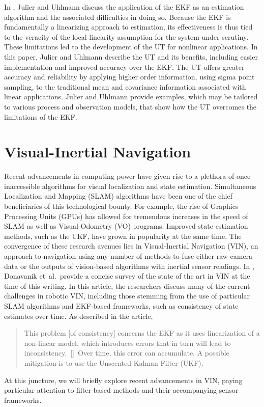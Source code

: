 In \cite{Julier2004}, Julier and Uhlmann discuss the application of the EKF as an estimation algorithm and the associated difficulties in doing so. Because the EKF is fundamentally a linearizing approach to estimation, its effectiveness is thus tied to the veracity of the local linearity assumption for the system under scrutiny. These limitations led to the development of the UT for nonlinear applications. In this paper, Julier and Uhlmann describe the UT and its benefits, including easier implementation and improved accuracy over the EKF. The UT offers greater accuracy and reliability by applying higher order information, using sigma point sampling, to the traditional mean and covariance information associated with linear applications. Julier and Uhlmann provide examples, which may be tailored to various process and observation models, that show how the UT overcomes the limitations of the EKF.

\section{Visual-Inertial Navigation}

Recent advancements in computing power have given rise to a plethora of once-inaccessible algorithms for visual localization and state estimation. Simultaneous Localization and Mapping (SLAM) algorithms have been one of the chief beneficiaries of this technological bounty. For example, the rise of Graphics Processing Units (GPUs) has allowed for tremendous increases in the speed of SLAM as well as Visual Odometry (VO) programs. Improved state estimation methods, such as the UKF, have grown in popularity at the same time. The convergence of these research avenues lies in Visual-Inertial Navigation (VIN), an approach to navigation using any number of methods to fuse either raw camera data or the outputs of vision-based algorithms with inertial sensor readings. In \cite{Donavanik2016}, Donavanik et~al.\ provide a concise survey of the state of the art in VIN at the time of this writing. In this article, the researchers discuss many of the current challenges in robotic VIN, including those stemming from the use of particular SLAM algorithms and EKF-based frameworks, such as consistency of state estimates over time. As described in the article,
%
\begin{quote}
This problem [of consistency] concerns the EKF as it uses linearization of a non-linear model, which introduces errors that in turn will lead to inconsistency.\ [\textellipsis]\ Over time, this error can accumulate. A possible mitigation is to use the Unscented Kalman Filter (UKF). 
\end{quote}
%
At this juncture, we will briefly explore recent advancements in VIN, paying particular attention to filter-based methods and their accompanying sensor frameworks.

